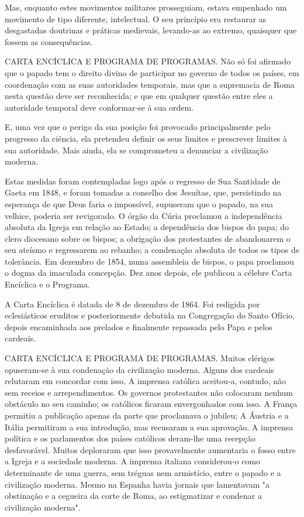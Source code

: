 \documentclass[11pt,a5paper,twoside,openany]{book}
\begin{document}
Mas, enquanto estes movimentos militares prosseguiam, estava empenhado um movimento de tipo diferente, intelectual. O seu princípio era restaurar as desgastadas doutrinas e práticas medievais, levando-as ao extremo, quaisquer que fossem as consequências.

CARTA ENCÍCLICA E PROGRAMA DE PROGRAMAS. Não só foi afirmado que o papado tem o direito divino de participar no governo de todos os países, em coordenação com as suas autoridades temporais, mas que a supremacia de Roma nesta questão deve ser reconhecida; e que em qualquer questão entre eles a autoridade temporal deve conformar-se à sua ordem.

E, uma vez que o perigo da sua posição foi provocado principalmente pelo progresso da ciência, ela pretendeu definir os seus limites e prescrever limites à sua autoridade. Mais ainda, ela se comprometeu a denunciar a civilização moderna.

Estas medidas foram contempladas logo após o regresso de Sua Santidade de Gaeta em 1848, e foram tomadas a conselho dos Jesuítas, que, persistindo na esperança de que Deus faria o impossível, supuseram que o papado, na sua velhice, poderia ser revigorado. O órgão da Cúria proclamou a independência absoluta da Igreja em relação ao Estado; a dependência dos bispos do papa; do clero diocesano sobre os bispos; a obrigação dos protestantes de abandonarem o seu ateísmo e regressarem ao rebanho; a condenação absoluta de todos os tipos de tolerância. Em dezembro de 1854, numa assembleia de bispos, o papa proclamou o dogma da imaculada concepção. Dez anos depois, ele publicou a célebre Carta Encíclica e o Programa.

A Carta Encíclica é datada de 8 de dezembro de 1864. Foi redigida por eclesiásticos eruditos e posteriormente debatida na Congregação do Santo Ofício, depois encaminhada aos prelados e finalmente repassada pelo Papa e pelos cardeais.

CARTA ENCÍCLICA E PROGRAMA DE PROGRAMAS. Muitos clérigos opuseram-se à sua condenação da civilização moderna. Alguns dos cardeais relutaram em concordar com isso. A imprensa católica aceitou-a, contudo, não sem receios e arrependimentos. Os governos protestantes não colocaram nenhum obstáculo no seu caminho; os católicos ficaram envergonhados com isso. A França permitiu a publicação apenas da parte que proclamava o jubileu; A Áustria e a Itália permitiram a sua introdução, mas recusaram a sua aprovação. A imprensa política e os parlamentos dos países católicos deram-lhe uma recepção desfavorável. Muitos deploraram que isso provavelmente aumentaria o fosso entre a Igreja e a sociedade moderna. A imprensa italiana considerou-o como determinante de uma guerra, sem tréguas nem armistício, entre o papado e a civilização moderna. Mesmo na Espanha havia jornais que lamentavam "a obstinação e a cegueira da corte de Roma, ao estigmatizar e condenar a civilização moderna".
\end{document}
